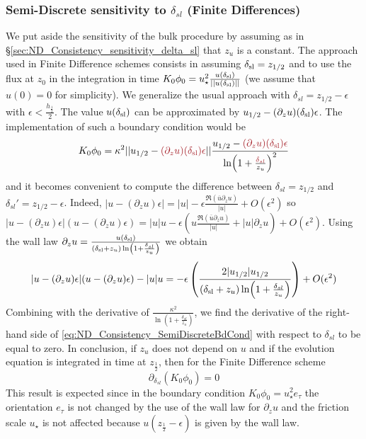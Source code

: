 \subsubsection{Semi-Discrete sensitivity to $\delta_{sl}$
			(Finite Differences)}
\label{sec:ND_Consistency_S-DAnalyticalStudy}
We put aside the sensitivity of the bulk procedure by
assuming as in \S \ref{sec:ND_Consistency_sensitivity_delta_sl}
that $z_{u}$ is a constant.
%
The approach used in Finite Difference schemes consists in assuming
$\delta_{\rm sl} = z_{1/2}$ and to use the flux at $z_0$ in
the integration in time
$K_0\phi_0 = u_\star^2
\frac{u(\delta_{\rm sl})}{||u(\delta_{\rm sl})||}$
(we assume that $u(0)=0$ for simplicity).
We generalize the usual approach with
$\delta_{sl} = z_{1/2} - \epsilon$ with
$\epsilon < \frac{h_{\frac{1}{2}}}{2}$. 
The value $u(\delta_{\rm sl})$ can be approximated
by $u_{1/2} - (\partial_z u)(\delta_{\rm sl})\epsilon$.
The implementation of such a boundary condition would be
\begin{equation}
	\label{eq:ND_Consistency_SemiDiscreteBdCond}
K_0\phi_0 = 
	\kappa^2 ||u_{1/2} -
	\emphase{(\partial_z u)(\delta_{\rm sl})\epsilon} ||
	\frac{u_{1/2} -
	\emphase{(\partial_z u)(\delta_{\rm sl})\epsilon 
	}}{\ln(1+\frac{\emphase{\delta_{sl}}}{z_{u}})^2}
\end{equation}
and it becomes convenient to compute the difference between
$\delta_{sl}=z_{1/2}$ and $\delta_{sl}'=z_{1/2}-\epsilon$.
Indeed,
$|u - (\partial_z u) \epsilon| = |u| -
\epsilon \frac{\mathfrak{R}(\overline{u} \partial_z u)}{|u|}
+ O(\epsilon^2)$ so
$|u - (\partial_z u) \epsilon|(u - (\partial_z u) \epsilon) =
|u|u -
\epsilon \left(
u\frac{\mathfrak{R}(\overline{u} \partial_z u)}{|u|}
+ |u| \partial_z u
\right)
+ O(\epsilon^2)$.
Using the wall law
$\partial_z u=\frac{u(\delta_{\rm sl})}{(\delta_{\rm sl} + z_u)
\ln(1+\frac{\delta_{sl}}{z_u})}$ we obtain 
\begin{equation}
|u - (\partial_z u) \epsilon|(u - (\partial_z u) \epsilon) - |u|u =
	- \epsilon \left(\frac{2|u_{1/2}|u_{1/2}}
	{(\delta_{\rm sl} + z_u) \ln(1+\frac{\delta_{sl}}{z_u})}
	\right)+ O(\epsilon^2)
\end{equation}
Combining with the derivative of
$\frac{\kappa^2}{\ln(1+\frac{\delta_{sl}}{z_u})}$,
we find the derivative of the right-hand side of
\eqref{eq:ND_Consistency_SemiDiscreteBdCond} with respect to
$\delta_{sl}$ to be equal to zero.
In conclusion, if $z_{u}$ does not depend on $u$ and if
the evolution equation is integrated in time at $z_\frac{1}{2}$,
then for the Finite Difference scheme
\begin{equation}
	\partial_{\delta_{sl}} (K_0 \phi_0) = 0
\end{equation}
This result is expected since in the boundary condition
$K_0 \phi_0 = u_\star^2 e_\tau$ the orientation $e_\tau$ is
not changed by the use of the wall law for $\partial_z u$
and the friction scale $u_\star$ is not affected because
$u(z_\frac{1}{2} - \epsilon)$ is given by the wall law.
